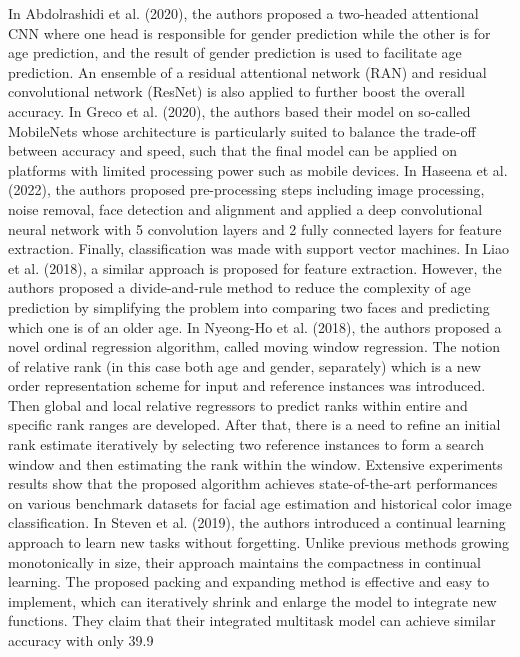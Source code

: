 \begin{introduction}
In Abdolrashidi et al. (2020), the authors proposed a two-headed attentional CNN
where one head is responsible for gender prediction while the other is for age prediction, and
the result of gender prediction is used to facilitate age prediction. An ensemble of a residual
attentional network (RAN) and residual convolutional network (ResNet) is also applied to
further boost the overall accuracy.
In Greco et al. (2020), the authors based their model on so-called MobileNets whose
architecture is particularly suited to balance the trade-off between accuracy and speed, such
that the final model can be applied on platforms with limited processing power such as
mobile devices.
In Haseena et al. (2022), the authors proposed pre-processing steps including image
processing, noise removal, face detection and alignment and applied a deep convolutional
neural network with 5 convolution layers and 2 fully connected layers for feature extraction.
Finally, classification was made with support vector machines. In Liao et al. (2018), a similar
approach is proposed for feature extraction. However, the authors proposed a
divide-and-rule method to reduce the complexity of age prediction by simplifying the problem
into comparing two faces and predicting which one is of an older age.
In Nyeong-Ho et al. (2018), the authors proposed a novel ordinal regression
algorithm, called moving window regression. The notion of relative rank (in this case both
age and gender, separately) which is a new order representation scheme for input and
reference instances was introduced. Then global and local relative regressors to predict
ranks within entire and specific rank ranges are developed. After that, there is a need to
refine an initial rank estimate iteratively by selecting two reference instances to form a search
window and then estimating the rank within the window. Extensive experiments results show
that the proposed algorithm achieves state-of-the-art performances on various benchmark
datasets for facial age estimation and historical color image classification.
In Steven et al. (2019), the authors introduced a continual learning approach to learn
new tasks without forgetting. Unlike previous methods growing monotonically in size, their
approach maintains the compactness in continual learning. The proposed packing and
expanding method is effective and easy to implement, which can iteratively shrink and
enlarge the model to integrate new functions. They claim that their integrated multitask model
can achieve similar accuracy with only 39.9%


\end{introduction}
